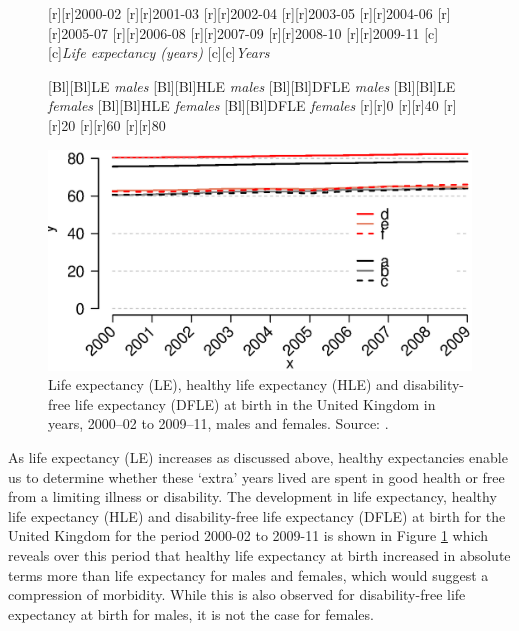 \documentclass[11 pt, a4paper]{report}
\begin{document}
\begin{figure}[hbtp!]
[r][r]{\small{2000-02}}
[r][r]{\small{2001-03}}
[r][r]{\small{2002-04}}
[r][r]{\small{2003-05}}
[r][r]{\small{2004-06}}
[r][r]{\small{2005-07}}
[r][r]{\small{2006-08}}
[r][r]{\small{2007-09}}
[r][r]{\small{2008-10}}
[r][r]{\small{2009-11}}
[c][c]{\small{\emph{Life expectancy (years)}}}
[c][c]{\small{\emph{Years}}}

[Bl][Bl]{\small{LE \emph{males}}}
[Bl][Bl]{\small{HLE \emph{males}}}
[Bl][Bl]{\small{DFLE \emph{males}}}
[Bl][Bl]{\small{LE \emph{females}}}
[Bl][Bl]{\small{HLE \emph{females}}}
[Bl][Bl]{\small{DFLE \emph{females}}}
[r][r]{\small{0}}
[r][r]{\small{40}}
[r][r]{\small{20}}
[r][r]{\small{60}}
[r][r]{\small{80}}

\includegraphics[width=\textwidth]{../figures/Fig3.1.eps}
\caption{Life expectancy (LE), healthy life expectancy (HLE) and disability-free life expectancy (DFLE) at birth in the United Kingdom in years, 2000--02 to 2009--11, males and females. Source: \citet{ONS2012}.}
\label{Fig:31}
\end{figure}



As life expectancy (LE) increases as discussed above, healthy expectancies enable us to determine whether these `extra' years lived are spent in good health or free from a limiting illness or disability. The development in life expectancy, healthy life expectancy (HLE) and disability-free life expectancy (DFLE) at birth for the United Kingdom for the period 2000-02 to 2009-11 is shown in Figure \ref{Fig:31} which reveals over this period that healthy life expectancy at birth increased in absolute terms more than life expectancy for males and females, which would suggest a compression of morbidity. While this is also observed for disability-free life expectancy at birth for males, it is not the case for females.  
\end{document}
